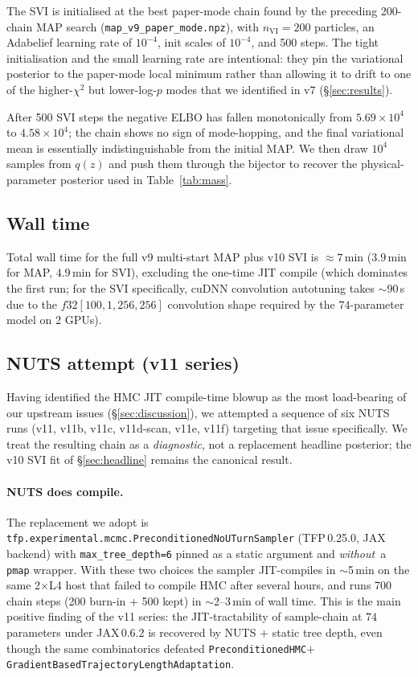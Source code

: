 \documentclass[11pt,letterpaper]{article}
\begin{document}
The SVI is initialised at the best paper-mode chain found by the
preceding 200-chain MAP search (\texttt{map\_v9\_paper\_mode.npz}),
with $n_{\mathrm{VI}}=200$ particles, an Adabelief learning rate of
$10^{-4}$, init scales of $10^{-4}$, and 500 steps. The tight
initialisation and the small learning rate are intentional: they pin
the variational posterior to the paper-mode local minimum rather than
allowing it to drift to one of the higher-$\chi^{2}$ but lower-log-$p$
modes that we identified in v7 (\S\ref{sec:results}).

After 500 SVI steps the negative ELBO has fallen monotonically from
$5.69\times10^{4}$ to $4.58\times10^{4}$; the chain shows no sign of
mode-hopping, and the final variational mean is essentially indistinguishable
from the initial MAP. We then draw $10^{4}$ samples from $q(z)$ and
push them through the bijector to recover the physical-parameter
posterior used in Table~\ref{tab:mass}.

\subsection{Wall time}
Total wall time for the full v9 multi-start MAP plus v10 SVI is
$\approx7\,$min ($3.9\,$min for MAP, $4.9\,$min for SVI), excluding
the one-time JIT compile (which dominates the first run; for the SVI
specifically, cuDNN convolution autotuning takes $\sim 90\,$s due to
the $f32[100,1,256,256]$ convolution shape required by the $74$-parameter
model on 2 GPUs).

\subsection{NUTS attempt (v11 series)}
\label{sec:nuts}

Having identified the HMC JIT compile-time blowup as the most
load-bearing of our upstream issues (\S\ref{sec:discussion}), we
attempted a sequence of six NUTS runs (v11, v11b, v11c, v11d-scan,
v11e, v11f) targeting that issue specifically. We treat the resulting
chain as a {\it diagnostic}, not a replacement headline posterior;
the v10 SVI fit of \S\ref{sec:headline} remains the canonical result.

\paragraph{NUTS does compile.} The replacement we adopt is
\texttt{tfp.experimental.mcmc.PreconditionedNoUTurnSampler} (TFP\,0.25.0,
JAX backend) with \texttt{max\_tree\_depth=6} pinned as a static argument
and {\it without}\ a \texttt{pmap} wrapper. With these two choices the
sampler JIT-compiles in $\sim$5\,min on the same 2$\times$L4 host that
failed to compile HMC after several hours, and runs 700 chain steps
(200 burn-in $+$ 500 kept) in $\sim$2--3\,min of wall time. This is
the main positive finding of the v11 series: the JIT-tractability of
sample-chain at $74$ parameters under JAX\,0.6.2 is recovered by NUTS
$+$ static tree depth, even though the same combinatorics defeated
\texttt{PreconditionedHMC}$+$\texttt{Gra\-dient\-Based\-Tra\-jec\-tory\-Length\-Adap\-ta\-tion}.
\end{document}
